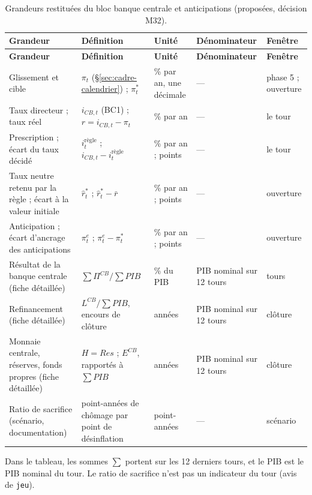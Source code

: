 \documentclass[11pt,a4paper]{article}
\begin{document}
\begin{center}\small
\setlength{\tabcolsep}{4pt}
\begin{longtable}{>{\raggedright\arraybackslash}p{2.8cm}>{\raggedright\arraybackslash}p{4.7cm}>{\raggedright\arraybackslash}p{1.8cm}>{\raggedright\arraybackslash}p{2.6cm}>{\raggedright\arraybackslash}p{2.5cm}}
\caption{Grandeurs restituées du bloc banque centrale et anticipations (proposées, décision M32).}\label{tab:banque_centrale-restitution}\\
\toprule
\textbf{Grandeur} & \textbf{Définition} & \textbf{Unité} & \textbf{Dénominateur} & \textbf{Fenêtre}\\
\midrule
\endfirsthead
\toprule
\textbf{Grandeur} & \textbf{Définition} & \textbf{Unité} & \textbf{Dénominateur} & \textbf{Fenêtre}\\
\midrule
\endhead
Glissement et cible & $\pi_t$ (\S\ref{sec:cadre-calendrier}) ; $\pi^\ast_t$ & \% par an, une décimale & --- & phase 5 ; ouverture\\
Taux directeur ; taux réel & $i_{\mathit{CB},t}$ (BC1) ; $r = i_{\mathit{CB},t} - \pi_t$ & \% par an & --- & le tour\\
Prescription ; écart du taux décidé & $i^{\text{règle}}_t$ ; $i_{\mathit{CB},t} - i^{\text{règle}}_t$ & \% par an ; points & --- & le tour\\
Taux neutre retenu par la règle ; écart à la valeur initiale & $\hat r^\ast_t$ ; $\hat r^\ast_t - \bar r$ & \% par an ; points & --- & ouverture\\
Anticipation ; écart d'ancrage des anticipations & $\pi^e_t$ ; $\pi^e_t - \pi^\ast_t$ & \% par an ; points & --- & ouverture\\
Résultat de la banque centrale (fiche détaillée) & $\sum \Pi^{\mathit{CB}}/\sum \mathit{PIB}$ & \% du PIB & PIB nominal sur 12 tours & 12 tours\\
Refinancement (fiche détaillée) & $L^{\mathit{CB}}/\sum \mathit{PIB}$, encours de clôture & années & PIB nominal sur 12 tours & clôture\\
Monnaie centrale, réserves, fonds propres (fiche détaillée) & $H = \mathit{Res}$ ; $E^{\mathit{CB}}$, rapportés à $\sum \mathit{PIB}$ & années & PIB nominal sur 12 tours & clôture\\
Ratio de sacrifice (scénario, documentation) & point-années de chômage par point de désinflation & point-années & --- & scénario\\
\bottomrule
\end{longtable}
\end{center}
Dans le tableau, les sommes $\sum$ portent sur les 12 derniers tours, et le PIB est le PIB nominal du tour. Le ratio de sacrifice n'est pas un indicateur du tour (avis de \texttt{jeu}).
\end{document}
